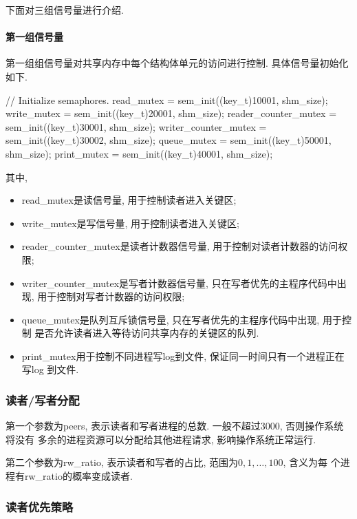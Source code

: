 下面对三组信号量进行介绍.

\paragraph{第一组信号量}
第一组组信号量对共享内存中每个结构体单元的访问进行控制. 具体信号量初始化如下.
\begin{code}
    // Initialize semaphores.
    read_mutex = sem_init((key_t)10001, shm_size);
    write_mutex = sem_init((key_t)20001, shm_size);
    reader_counter_mutex = sem_init((key_t)30001, shm_size);
    writer_counter_mutex = sem_init((key_t)30002, shm_size);
    queue_mutex = sem_init((key_t)50001, shm_size);
    print_mutex = sem_init((key_t)40001, shm_size);
\end{code}
其中,
\begin{itemize}
    \item read\_mutex是读信号量, 用于控制读者进入关键区;
    \item  write\_mutex是写信号量, 用于控制读者进入关键区;
    \item  reader\_counter\_mutex是读者计数器信号量, 用于控制对读者计数器的访问权限;
    \item writer\_counter\_mutex是写者计数器信号量, 只在写者优先的主程序代码中出现,
          用于控制对写者计数器的访问权限;
    \item queue\_mutex是队列互斥锁信号量, 只在写者优先的主程序代码中出现, 用于控制
          是否允许读者进入等待访问共享内存的关键区的队列.
    \item print\_mutex用于控制不同进程写log到文件, 保证同一时间只有一个进程正在写log
          到文件.
\end{itemize}

\subsubsection{读者/写者分配}
第一个参数为peers, 表示读者和写者进程的总数. 一般不超过3000, 否则操作系统将没有
多余的进程资源可以分配给其他进程请求, 影响操作系统正常运行.\par

第二个参数为rw\_ratio, 表示读者和写者的占比, 范围为$0, 1, \dots, 100$, 含义为每
个进程有rw\_ratio的概率变成读者.\par

\subsubsection{读者优先策略}

